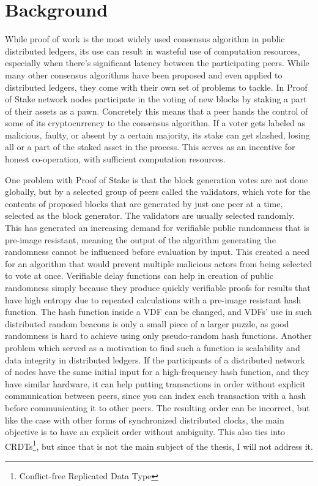 \section{Background}
While proof of work is the most widely used consensus algorithm in public distributed ledgers, its use can result in wasteful use of computation resources, especially when there's significant latency between the participating peers. While many other consensus algorithms have been proposed and even applied to distributed ledgers, they come with their own set of problems to tackle. In Proof of Stake network nodes participate in the voting of new blocks by staking a part of their assets as a pawn. Concretely this means that a peer hands the control of some of its cryptocurrency to the consensus algorithm. If a voter gets labeled as malicious, faulty, or absent by a certain majority, its stake can get slashed, losing all or a part of the staked asset in the process. This serves as an incentive for honest co-operation, with sufficient computation resources.

One problem with Proof of Stake is that the block generation votes are not done globally, but by a selected group of peers called the validators, which vote for the contents of proposed blocks that are generated by just one peer at a time, selected as the block generator. The validators are usually selected randomly. This has generated an increasing demand for verifiable public randomness that is pre-image resistant, meaning the output of the algorithm generating the randomness cannot be influenced before evaluation by input. This created a need for an algorithm that would prevent multiple malicious actors from being selected to vote at once. Verifiable delay functions can help in creation of public randomness simply because they produce quickly verifiable proofs for results that have high entropy due to repeated calculations with a pre-image resistant hash function. The hash function inside a VDF can be changed, and VDFs' use in such distributed random beacons is only a small piece of a larger puzzle, as good randomness is hard to achieve using only pseudo-random hash functions. Another problem which served as a motivation to find such a function is scalability and data integrity in distributed ledgers. If the participants of a distributed network of nodes have the same initial input for a high-frequency hash function, and they have similar hardware, it can help putting transactions in order without explicit communication between peers, since you can index each transaction with a hash before communicating it to other peers. The resulting order can be incorrect, but like the case with other forms of synchronized distributed clocks, the main objective is to have an explicit order without ambiguity. This also ties into CRDTs\footnote{Conflict-free Replicated Data Type}, but since that is not the main subject of the thesis, I will not address it.


